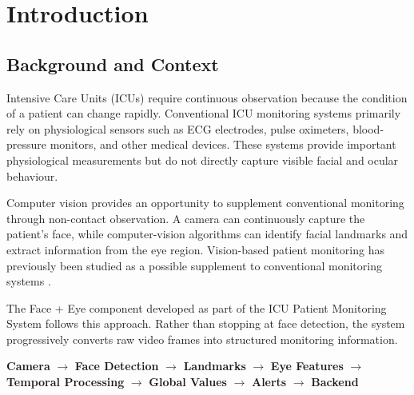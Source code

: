 \documentclass{tietreport}
\begin{document}
\listoffigures


\listoftables


\clearpage



\chapter{Introduction}

\section{Background and Context}

Intensive Care Units (ICUs) require continuous observation because the
condition of a patient can change rapidly. Conventional ICU monitoring
systems primarily rely on physiological sensors such as ECG
electrodes, pulse oximeters, blood-pressure monitors, and other medical
devices. These systems provide important physiological measurements
but do not directly capture visible facial and ocular behaviour.

Computer vision provides an opportunity to supplement conventional
monitoring through non-contact observation. A camera can continuously
capture the patient's face, while computer-vision algorithms can
identify facial landmarks and extract information from the eye region.
Vision-based patient monitoring has previously been studied as a
possible supplement to conventional monitoring systems
\cite{BDMS16,DMS19}.

The Face + Eye component developed as part of the ICU Patient
Monitoring System follows this approach. Rather than stopping at face
detection, the system progressively converts raw video frames into
structured monitoring information.

\begin{center}
\textbf{Camera}
$\rightarrow$
\textbf{Face Detection}
$\rightarrow$
\textbf{Landmarks}
$\rightarrow$
\textbf{Eye Features}
$\rightarrow$
\textbf{Temporal Processing}
$\rightarrow$
\textbf{Global Values}
$\rightarrow$
\textbf{Alerts}
$\rightarrow$
\textbf{Backend}
\end{center}
\end{document}
